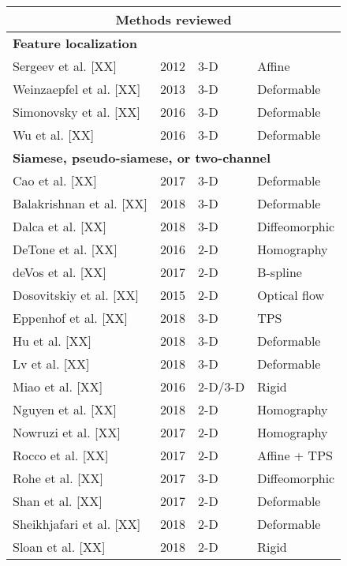 

\begin{table}[!htb]
\centering
\caption{}
\label{table:methods}
\begin{tabular*}{\textwidth}{l@{\extracolsep{\fill}}l@{\extracolsep{\fill}}l@{\extracolsep{\fill}}l}
\toprule
\multicolumn{4}{c}{\textbf{Methods reviewed}}    \\
\midrule
\multicolumn{4}{l}{\textbf{Feature localization}}
  \vspace{0.25cm} \\
  Sergeev et al. [XX] & 2012 & 3-D & Affine \\
  Weinzaepfel et al. [XX] & 2013 & 3-D & Deformable \\
  Simonovsky et al. [XX] & 2016 & 3-D & Deformable \\
  Wu et al. [XX] & 2016 & 3-D & Deformable \\
\midrule
\multicolumn{4}{l}{\textbf{Siamese, pseudo-siamese, or two-channel}}
  \vspace{0.25cm} \\
  Cao et al. [XX] & 2017 & 3-D & Deformable \\
  Balakrishnan et al. [XX] & 2018 & 3-D & Deformable \\
  Dalca et al. [XX] & 2018 & 3-D & Diffeomorphic \\
  DeTone et al. [XX] & 2016 & 2-D & Homography \\
  deVos et al. [XX] & 2017 & 2-D & B-spline \\
  Dosovitskiy et al. [XX] & 2015 & 2-D & Optical flow \\
  Eppenhof et al. [XX] & 2018 & 3-D & TPS \\
  Hu et al. [XX] & 2018 & 3-D & Deformable \\
  Lv et al. [XX] & 2018 & 3-D & Deformable \\
  Miao et al. [XX] & 2016 & 2-D/3-D & Rigid \\
  Nguyen et al. [XX] & 2018 & 2-D & Homography \\
  Nowruzi et al. [XX] & 2017 & 2-D & Homography \\
  Rocco et al. [XX] & 2017 & 2-D & Affine + TPS \\
  Rohe et al. [XX] & 2017 & 3-D & Diffeomorphic \\
  Shan et al. [XX] & 2017 & 2-D & Deformable \\
  Sheikhjafari et al. [XX] & 2018 & 2-D & Deformable \\
  Sloan et al. [XX] & 2018 & 2-D & Rigid \\

\end{tabular*}
\end{table}
